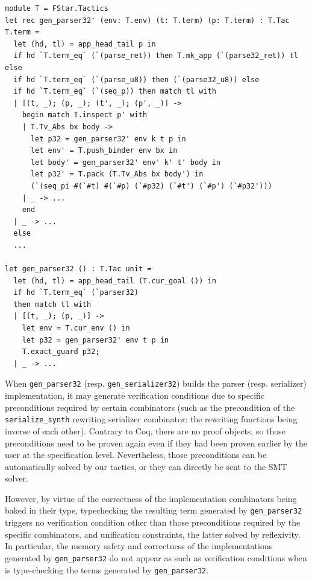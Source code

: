 \begin{lstlisting}
module T = FStar.Tactics
let rec gen_parser32' (env: T.env) (t: T.term) (p: T.term) : T.Tac T.term =
  let (hd, tl) = app_head_tail p in
  if hd `T.term_eq` (`(parse_ret)) then T.mk_app (`(parse32_ret)) tl else
  if hd `T.term_eq` (`(parse_u8)) then (`(parse32_u8)) else
  if hd `T.term_eq` (`(seq_p)) then match tl with
  | [(t, _); (p, _); (t', _); (p', _)] ->
    begin match T.inspect p' with
    | T.Tv_Abs bx body ->
      let p32 = gen_parser32' env k t p in
      let env' = T.push_binder env bx in
      let body' = gen_parser32' env' k' t' body in
      let p32' = T.pack (T.Tv_Abs bx body') in
      (`(seq_pi #(`#t) #(`#p) (`#p32) (`#t') (`#p') (`#p32')))
    | _ -> ...
    end
  | _ -> ...
  else
  ...

let gen_parser32 () : T.Tac unit =
  let (hd, tl) = app_head_tail (T.cur_goal ()) in
  if hd `T.term_eq` (`parser32)
  then match tl with
  | [(t, _); (p, _)] ->
    let env = T.cur_env () in
    let p32 = gen_parser32' env t p in
    T.exact_guard p32;
  | _ -> ...
\end{lstlisting}

When \verb+gen_parser32+ (resp. \verb+gen_serializer32+) builds the
parser (resp. serializer) implementation, it may generate verification
conditions due to specific preconditions required by certain
combinators (such as the precondition of the \verb+serialize_synth+
rewriting serializer combinator: the rewriting functions being inverse
of each other). Contrary to Coq, there are no proof objects, so those
preconditions need to be proven again even if they had been proven
earlier by the user at the specification level. Nevertheless, those
preconditions can be automatically solved by our tactics, or they can
directly be sent to the SMT solver.

However, by virtue of the correctness of the implementation
combinators being baked in their type, typechecking the resulting term
generated by \verb+gen_parser32+ triggers no verification condition
other than those preconditions required by the specific combinators,
and unification constraints, the latter solved by reflexivity. In
particular, the memory safety and correctness of the implementations
generated by \verb+gen_parser32+ do not appear as such as verification
conditions when \fstar is type-checking the terms generated
by \verb+gen_parser32+. 

